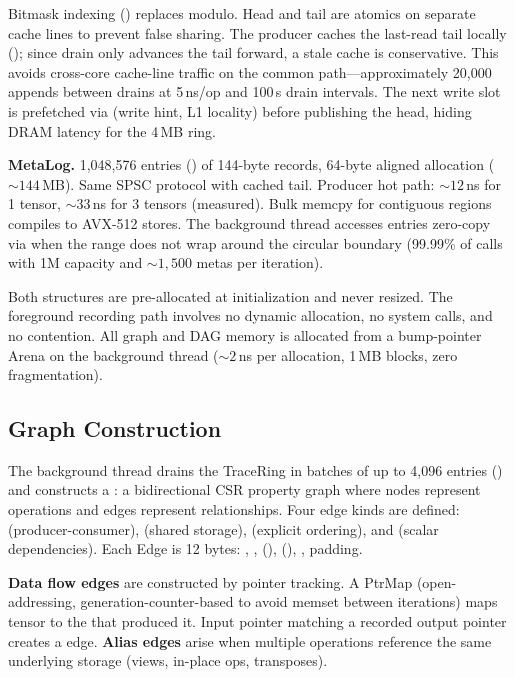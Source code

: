 Bitmask indexing () replaces modulo.
Head and tail are  atomics on separate cache lines to prevent false sharing.
The producer caches the last-read tail locally (); since drain only advances the tail forward, a stale cache is conservative.
This avoids cross-core cache-line traffic on the common path---approximately 20,000 appends between drains at 5\,ns/op and 100\,\textmu{}s drain intervals.
The next write slot is prefetched via  (write hint, L1 locality) before publishing the head, hiding DRAM latency for the 4\,MB ring.

\textbf{MetaLog.}
1,048,576 entries () of 144-byte  records, 64-byte aligned allocation (${\sim}144$\,MB).
Same SPSC protocol with cached tail.
Producer hot path: ${\sim}12$\,ns for 1 tensor, ${\sim}33$\,ns for 3 tensors (measured).
Bulk memcpy for contiguous regions compiles to AVX-512 stores.
The background thread accesses entries zero-copy via  when the range does not wrap around the circular boundary (99.99\% of calls with 1M capacity and ${\sim}1{,}500$ metas per iteration).

Both structures are pre-allocated at initialization and never resized.
The foreground recording path involves no dynamic allocation, no system calls, and no contention.
All graph and DAG memory is allocated from a bump-pointer Arena on the background thread (${\sim}2$\,ns per allocation, 1\,MB blocks, zero fragmentation).

\subsection{Graph Construction}

The background thread drains the TraceRing in batches of up to 4,096 entries () and constructs a : a bidirectional CSR property graph where nodes represent operations and edges represent relationships.
Four edge kinds are defined:  (producer-consumer),  (shared storage),  (explicit ordering), and  (scalar dependencies).
Each Edge is 12 bytes: , ,  (),  (), , padding.

\textbf{Data flow edges} are constructed by pointer tracking.
A PtrMap (open-addressing, generation-counter-based to avoid memset between iterations) maps tensor  to the  that produced it.
Input pointer matching a recorded output pointer creates a  edge.
\textbf{Alias edges} arise when multiple operations reference the same underlying storage (views, in-place ops, transposes).

